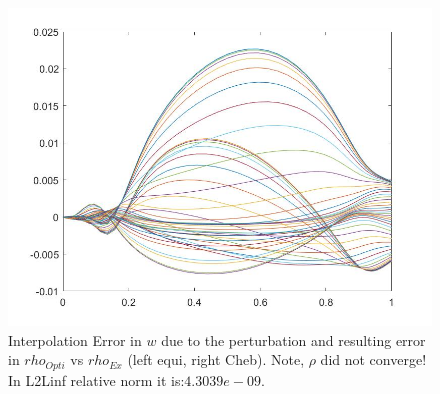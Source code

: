 \documentclass[11pt, a4paper]{article}
\theoremstyle{definition}
\begin{document}
\begin{figure}[h]
		\includegraphics[scale=0.25]{ErrrhoPert05b.jpg}
		\caption{Interpolation Error in $w$ due to the perturbation and resulting error in $rho_{Opti}$ vs $rho_{Ex}$ (left equi, right Cheb). Note, $\rho$ did not converge! In L2Linf relative norm it is:$4.3039e-09$. }
		\label{Pert3}
	\end{figure}
\end{document}
